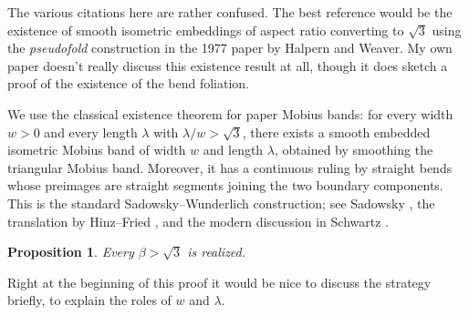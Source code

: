 \documentclass[12pt]{article}
\newtheorem{proposition}[theorem]{Proposition}
\newcommand{\review}[1]{\begin{reviewbox}#1\end{reviewbox}}
\begin{document}
\review{The various citations here are rather confused.  The best reference would be the existence of smooth isometric embeddings of aspect ratio converting to $\sqrt 3$ using the {\it pseudofold\/} construction in the 1977 paper by Halpern and Weaver.   My own paper doesn't really discuss this existence result at all, though it does sketch a proof of the existence of the bend foliation.}


We use the classical existence theorem for paper Mobius bands: for every width \(w>0\) and every length \(\lambda\) with \(\lambda/w>\sqrt3\), there exists a smooth embedded isometric Mobius band of width \(w\) and length \(\lambda\), obtained by smoothing the triangular Mobius band.  Moreover, it has a continuous ruling by straight bends whose preimages are straight segments joining the two boundary components.  This is the standard Sadowsky--Wunderlich construction; see Sadowsky \cite{Sadowsky}, the translation by Hinz--Fried \cite{HinzFried}, and the modern discussion in Schwartz \cite{Schwartz}.

\begin{proposition}
Every \(\beta>\sqrt3\) is realized.
\end{proposition}


\review{Right at the beginning of this proof it would be nice to discuss the strategy briefly, to explain the roles of $w$ and $\lambda$.}
\end{document}
